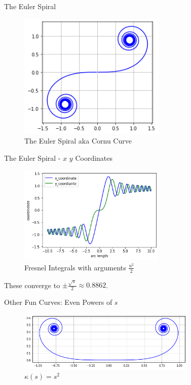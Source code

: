\documentclass{beamer}
\begin{document}
\begin{frame}{The Euler Spiral}
	\begin{figure}
		\caption{The Euler Spiral aka Cornu Curve}
		\centering
		\includegraphics[width=70mm, scale=0.5]{euler_spiral.png}
	\end{figure}
	
\end{frame}

\begin{frame}{The Euler Spiral - $x$ $y$ Coordinates}
	\begin{figure}
	\caption{Fresnel Integrals with arguments $\frac{u^2}{2}$}
	\centering
	\includegraphics[width=70mm, scale=0.5]{euler_x_vs_y.png}
	\end{figure}
	These converge to $\pm \frac{\sqrt{\pi}}{2} \approx 0.8862$.
\end{frame}

\begin{frame}{Other Fun Curves: Even Powers of $s$}
	\begin{figure}
		\caption{$\kappa(s) = s^2$}
		\centering
		\includegraphics[width=85mm, scale=0.5]{chaise_longue.png}
	\end{figure}
\end{frame}
\end{document}
